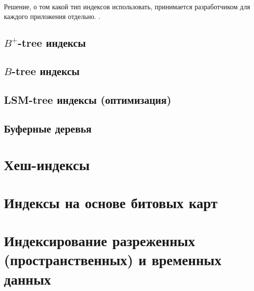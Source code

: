 Решение, о том какой тип индексов использовать, принимается разработчиком для
каждого приложения отдельно. .

\subsection{$B^+$-tree индексы}

\subsection{$B$-tree индексы}

\subsection{LSM-tree индексы (оптимизация)}

\subsection{Буферные деревья}

\section{Хеш-индексы}

\section{Индексы на основе битовых карт}

\section{Индексирование разреженных (пространственных) и временных данных}
